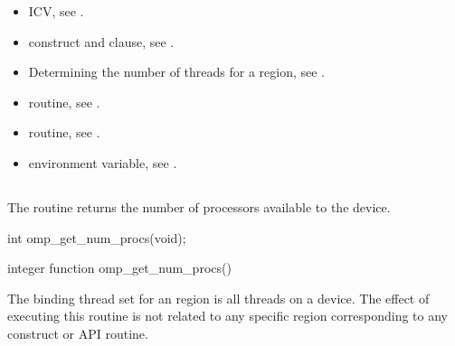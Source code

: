 \crossreferences
\begin{itemize}
\item {} ICV, see
.

\item {} construct and  clause, see
.

\item Determining the number of threads for a  region, see
.

\item {} routine, see
.

\item {} routine, see
.

\item {} environment variable, see
.
\end{itemize}








\subsection{}
\label{subsec:omp_get_num_procs}
\summary
The  routine returns the number of processors available to the
device.

\format
\begin{ccppspecific}
\begin{ompcFunction}
int omp_get_num_procs(void);
\end{ompcFunction}
\end{ccppspecific}

\begin{fortranspecific}
\begin{ompfFunction}
integer function omp_get_num_procs()
\end{ompfFunction}
\end{fortranspecific}

\binding
The binding thread set for an  region is all threads on a device.
The effect of executing this routine is not related to any specific region corresponding to
any construct or API routine.


